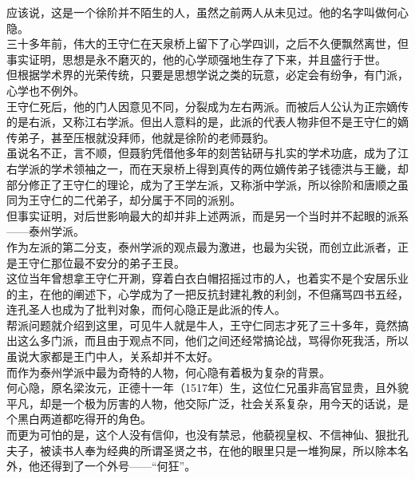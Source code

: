 \begin{multicols}{\theparacolNo}
应该说，这是一个徐阶并不陌生的人，虽然之前两人从未见过。他的名字叫做何心隐。\\

三十多年前，伟大的王守仁在天泉桥上留下了心学四训，之后不久便飘然离世，但事实证明，思想是永不磨灭的，他的心学顽强地生存了下来，并且盛行于世。\\

但根据学术界的光荣传统，只要是思想学说之类的玩意，必定会有纷争，有门派，心学也不例外。\\

王守仁死后，他的门人因意见不同，分裂成为左右两派。而被后人公认为正宗嫡传的是右派，又称江右学派。但出人意料的是，此派的代表人物非但不是王守仁的嫡传弟子，甚至压根就没拜师，他就是徐阶的老师聂豹。\\

虽说名不正，言不顺，但聂豹凭借他多年的刻苦钻研与扎实的学术功底，成为了江右学派的学术领袖之一，而在天泉桥上得到真传的两位嫡传弟子钱德洪与王畿，却部分修正了王守仁的理论，成为了王学左派，又称浙中学派，所以徐阶和唐顺之虽同为王守仁的二代弟子，却分属于不同的派别。\\

但事实证明，对后世影响最大的却并非上述两派，而是另一个当时并不起眼的派系——泰州学派。\\

作为左派的第二分支，泰州学派的观点最为激进，也最为尖锐，而创立此派者，正是王守仁那位最不安分的弟子王艮。\\

这位当年曾想拿王守仁开涮，穿着白衣白帽招摇过市的人，也着实不是个安居乐业的主，在他的阐述下，心学成为了一把反抗封建礼教的利剑，不但痛骂四书五经，连孔圣人也成为了批判对象，而何心隐正是此派的传人。\\

帮派问题就介绍到这里，可见牛人就是牛人，王守仁同志才死了三十多年，竟然搞出这么多门派，而且由于观点不同，他们之间还经常搞论战，骂得你死我活，所以虽说大家都是王门中人，关系却并不太好。\\

而作为泰州学派中最为奇特的人物，何心隐有着极为复杂的背景。\\

何心隐，原名梁汝元，正德十一年（1517年）生，这位仁兄虽非高官显贵，且外貌平凡，却是一个极为厉害的人物，他交际广泛，社会关系复杂，用今天的话说，是个黑白两道都吃得开的角色。\\

而更为可怕的是，这个人没有信仰，也没有禁忌，他藐视皇权、不信神仙、狠批孔夫子，被读书人奉为经典的所谓圣贤之书，在他的眼里只是一堆狗屎，所以除本名外，他还得到了一个外号——“何狂”。\\


\end{multicols}
